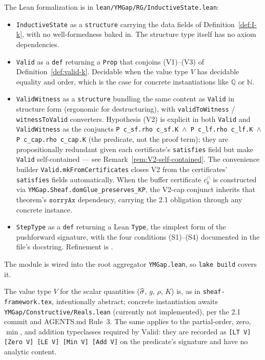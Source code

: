 The Lean formalization is in \texttt{lean/YMGap/RG/InductiveState.lean}:
\begin{itemize}
  \item \texttt{InductiveState} as a \texttt{structure} carrying the data fields of Definition~\ref{def:I-k}, with no well-formedness baked in.  The structure type itself has no axiom dependencies.
  \item \texttt{Valid} as a \texttt{def} returning a \texttt{Prop} that conjoins (V1)--(V3) of Definition~\ref{def:valid-k}.  Decidable when the value type $V$ has decidable equality and order, which is the case for concrete instantiations like $\mathbb{Q}$ or $\mathbb{N}$.
  \item \texttt{ValidWitness} as a \texttt{structure} bundling the same content as \texttt{Valid} in structure form (ergonomic for destructuring), with \texttt{validToWitness} / \texttt{witnessToValid} converters.  Hypothesis (V2) is explicit in both \texttt{Valid} and \texttt{ValidWitness} as the conjuncts \texttt{P c\_sf.rho c\_sf.K $\wedge$ P c\_lf.rho c\_lf.K $\wedge$ P c\_cap.rho c\_cap.K} (the predicate, not the proof term); they are propositionally redundant given each certificate's \texttt{satisfies} field but make \texttt{Valid} self-contained --- see Remark~\ref{rem:V2-self-contained}.  The convenience builder \texttt{Valid.mkFromCertificates} closes V2 from the certificates' \texttt{satisfies} fields automatically.  When the buffer certificate $c^{\cap}_k$ is constructed via \texttt{YMGap.Sheaf.domGlue\_preserves\_KP}, the V2-cap conjunct inherits that theorem's $\mathtt{sorryAx}$ dependency, carrying the 2.1 obligation through any concrete instance.
  \item \texttt{StepType} as a \texttt{def} returning a Lean \texttt{Type}, the simplest form of the pushforward signature, with the four conditions (S1)--(S4) documented in the file's docstring.  Refinement is .
\end{itemize}
The module is wired into the root aggregator \texttt{YMGap.lean}, so \texttt{lake build} covers it.

The value type $V$ for the scalar quantities ($\widehat{\sigma}$, $g$, $\rho$, $K$) is, as in \texttt{sheaf-framework.tex}, intentionally abstract; concrete instantiation awaits \texttt{YMGap/Constructive/Reals.lean} (currently not implemented), per the 2.1 commit and AGENTS.md Rule~3.  The same applies to the partial-order, zero, $\min$, and addition typeclasses required by $\mathrm{Valid}$: they are recorded as \texttt{[LT V] [Zero V] [LE V] [Min V] [Add V]} on the predicate's signature and have no analytic content.

